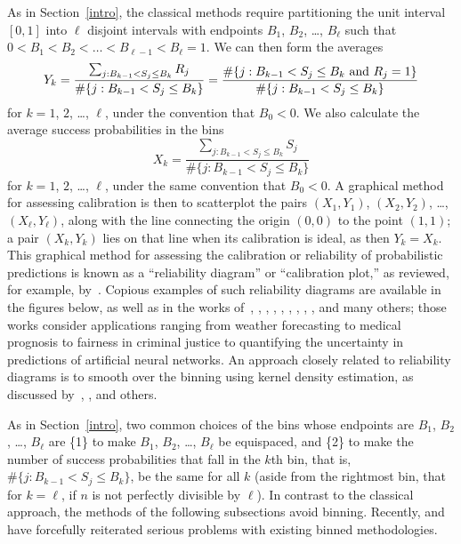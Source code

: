 \documentclass{article}
\begin{document}
As in Section~\ref{intro}, the classical methods 
require partitioning the unit interval $[0, 1]$ into $\ell$ disjoint intervals
with endpoints $B_1$, $B_2$, \dots, $B_{\ell}$ such that
$0 < B_1 < B_2 < \dots < B_{\ell-1} < B_{\ell} = 1$.
We can then form the averages
%
\begin{equation}
\label{avgY}
Y_k = \frac{\sum_{j : B_{k-1} < S_j \le B_k} R_j}
           {\#\{j : B_{k-1} < S_j \le B_k\}}
    = \frac{\#\{j : B_{k-1} < S_j \le B_k \hbox{ and } R_j = 1\}}
           {\#\{j : B_{k-1} < S_j \le B_k\}}
\end{equation}
%
for $k = 1$, $2$, \dots, $\ell$, under the convention that $B_0 < 0$.
We also calculate the average success probabilities in the bins
%
\begin{equation}
\label{avgX}
X_k = \frac{\sum_{j : B_{k-1} < S_j \le B_k} S_j}
           {\#\{j : B_{k-1} < S_j \le B_k\}}
\end{equation}
%
for $k = 1$, $2$, \dots, $\ell$, under the same convention that $B_0 < 0$.
A graphical method for assessing calibration is then to scatterplot the pairs
$(X_1, Y_1)$, $(X_2, Y_2)$, \dots, $(X_{\ell}, Y_{\ell})$,
along with the line connecting the origin $(0, 0)$ to the point $(1, 1)$;
a pair $(X_k, Y_k)$ lies on that line when its calibration is ideal,
as then $Y_k = X_k$.
This graphical method for assessing the calibration or reliability
of probabilistic predictions is known as a ``reliability diagram''
or ``calibration plot,'' as reviewed, for example, by~\cite{tygert}.
Copious examples of such reliability diagrams are available
in the figures below, as well as in the works
of~\cite{corbett-davies-pierson-feller-goel-huq},
\cite{crowson-atkinson-therneau}, \cite{murphy-winkler}, \cite{brocker},
\cite{wilks}, \cite{brocker-smith}, \cite{gneiting-balabdaoui-raftery},
\cite{guo-pleiss-sun-weinberger},
\cite{vaicenavicius-widmann-andersson-lindsten-roll-schoen},
and many others; those works consider applications ranging
from weather forecasting to medical prognosis to fairness in criminal justice
to quantifying the uncertainty in predictions of artificial neural networks.
An approach closely related to reliability diagrams is to smooth over
the binning using kernel density estimation, as discussed by~\cite{brocker},
\cite{wilks}, and others.

As in Section~\ref{intro}, two common choices of the bins
whose endpoints are $B_1$, $B_2$, \dots, $B_{\ell}$ are
\{1\} to make $B_1$, $B_2$, \dots, $B_{\ell}$ be equispaced, and
\{2\} to make the number of success probabilities that fall in the $k$th bin,
that is, $\#\{j : B_{k-1} < S_j \le B_k\}$, be the same for all $k$
(aside from the rightmost bin, that for $k = \ell$,
if $n$ is not perfectly divisible by $\ell$).
In contrast to the classical approach,
the methods of the following subsections avoid binning.
Recently, \cite{gupta-rahimi-ajanthan-mensink-sminchisescu-hartley}
and~\cite{roelofs-cain-shlens-mozer} have forcefully reiterated
serious problems with existing binned methodologies.
\end{document}
